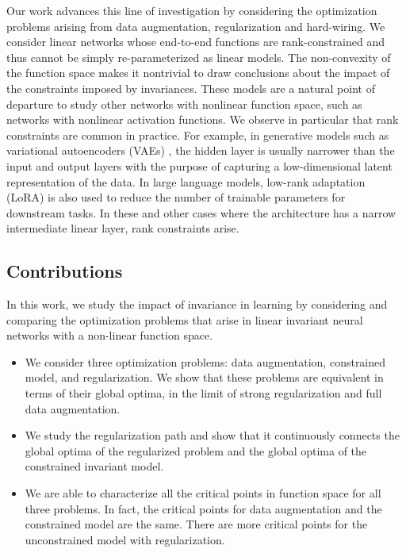 \documentclass{article}
\theoremstyle{plain}
\theoremstyle{definition}
\theoremstyle{remark}
\theoremstyle{remark}
\begin{document}
Our work advances this line of investigation by considering the optimization problems arising from data augmentation, regularization and hard-wiring. 
We consider linear networks whose end-to-end functions are rank-constrained and thus cannot be simply re-parameterized as linear models. 
The non-convexity of the function space makes it nontrivial to draw conclusions about the impact of the constraints imposed by invariances. 
These models are a natural point of departure to study other networks with nonlinear function space, such as networks with nonlinear activation functions. 
We observe in particular that rank constraints are common in practice. For example, in generative models such as variational autoencoders (VAEs) \citep{kingma_2022}, the hidden layer is usually narrower than the input and output layers with the purpose of capturing a low-dimensional latent representation of the data. In large language models, low-rank adaptation (LoRA) \citep{hu_2021} is also used to reduce the number of trainable parameters for downstream tasks. 
In these and other cases where the architecture has a narrow intermediate linear layer, rank constraints arise.

\subsection{Contributions}
In this work, we study the impact of invariance in learning by considering and comparing the optimization problems that arise in linear invariant neural networks with a non-linear function space. 

\begin{itemize}
    \item We consider three optimization problems: data augmentation, constrained model, and regularization. We show that these problems are equivalent in terms of their global optima, in the limit of strong regularization and full data augmentation. 
    
    \item We study the regularization path and show that it continuously connects the global optima of the regularized problem and the global optima of the constrained invariant model. 
    
    \item We are able to characterize all the critical points in function space for all three problems. In fact, the critical points for data augmentation and the constrained model are the same. There are more critical points for the unconstrained model with regularization. 
\end{itemize}
\end{document}
